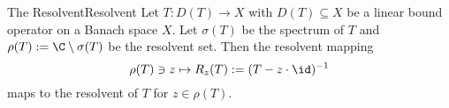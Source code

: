 \begin{mdef}{The Resolvent}{Resolvent}
    Let $T:D(T)\to X$ with $D(T)\subseteq X$ be a linear bound operator on a Banach space $X$. Let $\sigma(T)$ be the spectrum of $T$ and $\rho(T):=\C\setminus\sigma(T)$ be the resolvent set. Then the resolvent mapping
    \[
        \rho(T)\ni z \mapsto R_z(T) := (T - z\cdot\id)^{-1}
    \]
    maps to the resolvent of $T$ for $z\in\rho(T)$.
\end{mdef}